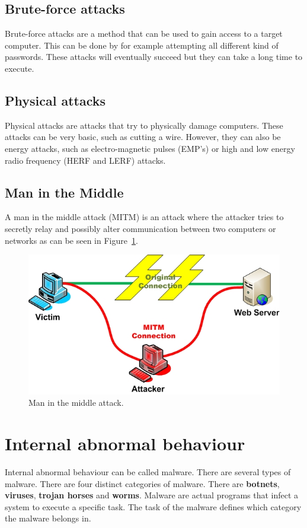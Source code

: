 \subsection{Brute-force attacks}
Brute-force attacks are a method that can be used to gain access to a target computer. This can be done by for example attempting all different kind of passwords. These attacks will eventually succeed but they can take a long time to execute. \cite{paulauskas2015computer}

\subsection{Physical attacks}
Physical attacks are attacks that try to physically damage computers. These attacks can be very basic, such as cutting a wire. However, they can also be energy attacks, such as  electro-magnetic pulses (EMP's) or high and low energy radio frequency (HERF and LERF) attacks. \cite{hansman2005taxonomy}

\subsection{Man in the Middle}
A man in the middle attack (MITM) is an attack where the attacker tries to secretly relay and possibly alter communication between two computers or networks as can be seen in Figure~\ref{fig:mitm}.  

\begin{figure}[H]
\centering
\includegraphics[width=1\textwidth]{Figures/main_the_middle}
\decoRule
\caption[Man in the middle attack]{Man in the middle attack. \cite{mitmExample}}
\label{fig:mitm}
\end{figure}

\section{Internal abnormal behaviour}
Internal abnormal behaviour can be called malware. There are several types of malware. There are four distinct categories of malware. There are \textbf{botnets}, \textbf{viruses}, \textbf{trojan horses} and \textbf{worms}. Malware are actual programs that infect a system to execute a specific task. The task of the malware defines which category the malware belongs in.

